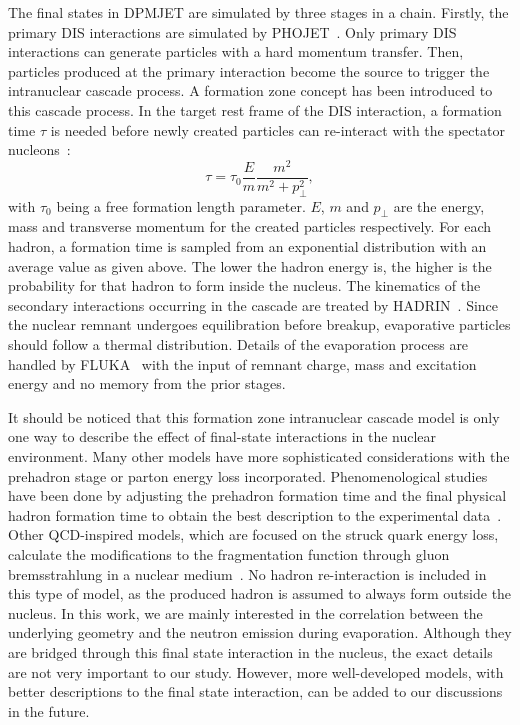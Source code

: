 The final states in DPMJET are simulated by three stages in a chain. Firstly,
the primary DIS interactions are simulated by PHOJET~\cite{Engel:1995yda}. Only
primary DIS interactions can generate particles with a hard momentum transfer.
Then, particles produced at the primary interaction become the source to trigger the
intranuclear cascade process. A formation zone concept has been introduced to
this cascade process. In the target rest frame of the DIS interaction, a
formation time $\tau$ is needed before newly created particles can re-interact
with the spectator nucleons~\cite{Ferrari:1995cq}:
\begin{equation}
\tau = \tau_{0}\frac{E}{m}\frac{m^{2}}{m^{2}+p^{2}_{\perp}},
\end{equation}
with $\tau_{0}$ being a free formation length parameter. $E$, $m$ and
$p_{\perp}$ are the energy, mass and transverse momentum for the created
particles respectively. For each hadron, a formation time is sampled from an
exponential distribution with an average value as given above. The lower the
hadron energy is, the higher is the probability for that hadron to form inside
the nucleus. The kinematics of the secondary interactions occurring in the
cascade are treated by HADRIN~\cite{Hanssgen:1986az}. Since the nuclear remnant
undergoes equilibration before breakup, evaporative particles should follow a
thermal distribution. Details of the evaporation process are handled by
FLUKA~\cite{Ferrari:2005zk} with the input of remnant charge, mass and
excitation energy and no memory from the prior stages.

It should be noticed that this formation zone intranuclear cascade model is only
one way to describe the effect of final-state interactions in the nuclear
environment. Many other models have more sophisticated considerations with the
prehadron stage or parton energy loss incorporated. Phenomenological studies
have been done by adjusting the prehadron formation time and the final physical
hadron formation time to obtain the best description to the experimental
data~\cite{Akopov:2004ap}. Other QCD-inspired models, which are focused on the
struck quark energy loss, calculate the modifications to the fragmentation
function through gluon bremsstrahlung in a nuclear
medium~\cite{Salgado:2003gb,Chang:2014fba}. No hadron re-interaction is included
in this type of model, as the produced hadron is assumed to always form outside
the nucleus. In this work, we are mainly interested in the correlation between
the underlying geometry and the neutron emission during evaporation. Although
they are bridged through this final state interaction in the nucleus, the exact
details are not very important to our study. However, more well-developed
models, with better descriptions to the final state interaction, can be added to
our discussions in the future.


